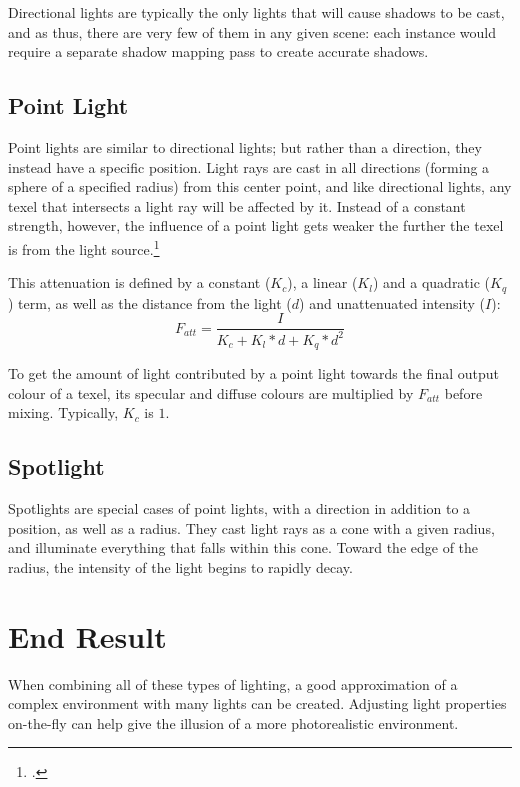 \documentclass[11pt, oneside]{report}
\begin{document}
Directional lights are typically the only lights that will cause shadows to be cast, and as thus, there are very few of them in any given scene: each instance would require a separate \gls{shadow mapping} pass to create accurate shadows.

\subsection{Point Light}
Point lights are similar to directional lights; but rather than a direction, they instead have a specific position. Light rays are cast in all directions (forming a sphere of a specified radius) from this center point, and like directional lights, any \gls{texel} that intersects a light ray will be affected by it. Instead of a constant strength, however, the influence of a point light gets weaker the further the \gls{texel} is from the light source.\footcite{pointlight-attenuate}	

This attenuation is defined by a constant ($K_c$), a linear ($K_l$) and a quadratic ($K_q$) term, as well as the distance from the light ($d$) and unattenuated intensity ($I$): \begin{equation} F_{att} = \frac{I}{K_c + K_l * d + K_q * d^2} \end{equation}

To get the amount of light contributed by a point light towards the final output colour of a \gls{texel}, its specular and diffuse colours are multiplied by $F_{att}$ before mixing. Typically, $K_c$ is $1$.

\subsection{Spotlight}
Spotlights are special cases of point lights, with a direction in addition to a position, as well as a radius. They cast light rays as a cone with a given radius, and illuminate everything that falls within this cone. Toward the edge of the radius, the intensity of the light begins to rapidly decay.

\section{End Result}
When combining all of these types of lighting, a good approximation of a complex environment with many lights can be created. Adjusting light properties on-the-fly can help give the illusion of a more photorealistic environment.
\end{document}
